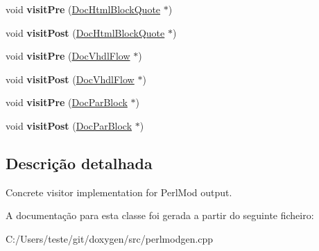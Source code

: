 \begin{DoxyCompactItemize}
\item 
\hypertarget{class_perl_mod_doc_visitor_a077910036b8f0a10c891bcee8cabb6f9}{void {\bfseries visit\-Pre} (\hyperlink{class_doc_html_block_quote}{Doc\-Html\-Block\-Quote} $\ast$)}\label{class_perl_mod_doc_visitor_a077910036b8f0a10c891bcee8cabb6f9}

\item 
\hypertarget{class_perl_mod_doc_visitor_a52c088bd7da086101ebe146d4fa12d03}{void {\bfseries visit\-Post} (\hyperlink{class_doc_html_block_quote}{Doc\-Html\-Block\-Quote} $\ast$)}\label{class_perl_mod_doc_visitor_a52c088bd7da086101ebe146d4fa12d03}

\item 
\hypertarget{class_perl_mod_doc_visitor_ab7c53055027c60e0a3a9f4f93e9c3d85}{void {\bfseries visit\-Pre} (\hyperlink{class_doc_vhdl_flow}{Doc\-Vhdl\-Flow} $\ast$)}\label{class_perl_mod_doc_visitor_ab7c53055027c60e0a3a9f4f93e9c3d85}

\item 
\hypertarget{class_perl_mod_doc_visitor_a79febe42f6e032c27aad9a418f979eca}{void {\bfseries visit\-Post} (\hyperlink{class_doc_vhdl_flow}{Doc\-Vhdl\-Flow} $\ast$)}\label{class_perl_mod_doc_visitor_a79febe42f6e032c27aad9a418f979eca}

\item 
\hypertarget{class_perl_mod_doc_visitor_acc4035c695184dd01a26145a88c1a588}{void {\bfseries visit\-Pre} (\hyperlink{class_doc_par_block}{Doc\-Par\-Block} $\ast$)}\label{class_perl_mod_doc_visitor_acc4035c695184dd01a26145a88c1a588}

\item 
\hypertarget{class_perl_mod_doc_visitor_a4bd3a84f45e2f6dc6420638ee8e4ee27}{void {\bfseries visit\-Post} (\hyperlink{class_doc_par_block}{Doc\-Par\-Block} $\ast$)}\label{class_perl_mod_doc_visitor_a4bd3a84f45e2f6dc6420638ee8e4ee27}

\end{DoxyCompactItemize}


\subsection{Descrição detalhada}
Concrete visitor implementation for Perl\-Mod output. 

A documentação para esta classe foi gerada a partir do seguinte ficheiro\-:\begin{DoxyCompactItemize}
\item 
C\-:/\-Users/teste/git/doxygen/src/perlmodgen.\-cpp\end{DoxyCompactItemize}
